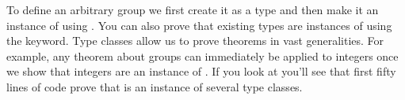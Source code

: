 \documentclass[letterpaper,10pt,english]{sphinxmanual}
\begin{document}
\sphinxAtStartPar
To define an arbitrary group  we first create it as a type  and then make it an instance of  using
\sphinxcode{\sphinxupquote{{[}group G{]}}}.
You can also prove that existing types are instances of  using the  keyword.
Type classes allow us to prove theorems in vast generalities.
For example, any theorem about groups can immediately be applied to integers once we show that integers are an instance of .
If you look at 
you’ll see that first fifty lines of code prove that  is an instance of several type classes.
\end{document}

